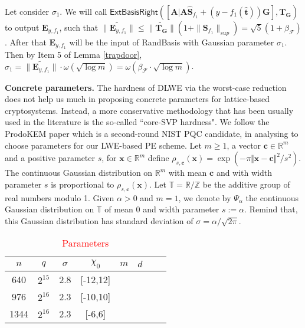 \documentclass[runningheads,10pt]{llncs}
\begin{document}
\iffalse

Let consider $\sigma_1$. We will call  $\textsf{ExtBasisRight}([\textbf{A}|\textbf{A}\widehat{\textbf{S}}_{f_1}+(y-f_1(\widehat{\mathbf{t}}))\textbf{G}], \textbf{T}_\textbf{G})$ to output $\textbf{E}_{y,f_1}$, such that $\| \widetilde{\textbf{E}_{y,f_1}}\| \leq \| \widetilde{\mathbf{T}_\mathbf{G}}\|(1+\|\mathbf{S}_{f_1}\|_{sup})=\sqrt{5}(1+\beta_{\mathcal{F}})$. After that $\textbf{E}_{y,f_1}$ will be the input of \textsf{RandBasis} with Gaussian parameter $\sigma_1$. Then by Item 5 of Lemma \ref{trapdoor}, $\sigma_1=\| \widetilde{\textbf{E}_{y,f_1}}\|\cdot\omega(\sqrt{\log m})=\omega(\beta_\mathcal{F}\cdot \sqrt{\log m})$. 

\textbf{Concrete parameters.} The hardness of DLWE via the worst-case reduction does not help  us much in proposing concrete parameters for lattice-based cryptosystems. Instead, a more conservative methodology that has been usually used in
the literature is the so-called ``core-SVP hardness".  We follow the ProdoKEM paper \cite[Subsection 5.2.1]{ABD+20} which is a second-round NIST PQC candidate, in analysing to choose parameters for our LWE-based PE scheme.
Let $m\geq 1$, a vector $\mathbf{c}\in \mathbb{R}^m$ and a positive parameter $s$, for $\mathbf{x}\in \mathbb{R}^m$ define $\rho_{s,\mathbf{c}}(\mathbf{x})= \exp({{-\pi \Vert \mathbf{x}-\mathbf{c}\Vert^2 }/{ s^2}})$. 
	The continuous Gaussian distribution on $\mathbb{R}^m$ with mean $\textbf{c}$ and with width parameter $s$ is proportional to $\rho_{s,\mathbf{c}}(\mathbf{x})$.  
	Let $\mathbb{T}=\mathbb{R}/\mathbb{Z}$ be the additive group of real numbers modulo 1. Given $\alpha>0$ and $m=1$,   we denote by $\Psi_{\alpha}$ the continuous Gaussian distribution on  $\mathbb{T}$ of mean $0$ and width parameter $s:=\alpha$. Remind that, this Gaussian distribution has standard deviation of $\sigma=\alpha/\sqrt{2\pi}$.
	
	
	\begin{table}[pt]
		\centering
		\medskip
		\smallskip
		\small\addtolength{\tabcolsep}{0pt}
		\begin{tabular}{ c | c| c|c|c|c |c|c}
			$n$&$q$&$\sigma$&$\chi_0$&$m$ & $d$& & \\
			\hline
			\hline 
			640&$2^{15}$& 2.8& [-12,12] && &  &\\
			976&$2^{16}$& 2.3& [-10,10] && &  &\\
			1344&$2^{16}$& 2.3& [-6,6] && &  &\\
			\hline
			
			
		\end{tabular} 
		
		\caption{ \textcolor{red}{ Parameters}}
		\label{tab1}
	\end{table}
	
\end{document}

